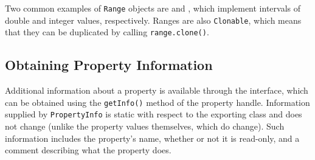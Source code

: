 \documentclass{article}
\begin{document}
Two common examples of {\tt Range} objects are  and
, which implement intervals of double and integer
values, respectively.  Ranges are also {\tt Clonable}, which means that
they can be duplicated by calling {\tt range.clone()}.


\label{propertyInfoSec}
\subsection{Obtaining Property Information}

Additional information about a property is available through the
 interface, which can be obtained using the
{\tt getInfo()} method of the property handle.  Information supplied by
{\tt PropertyInfo} is static with respect to the exporting class and
does not change (unlike the property values themselves, which do
change). Such information includes the property's name, whether or not
it is read-only, and a comment describing what the property does.
\end{document}
